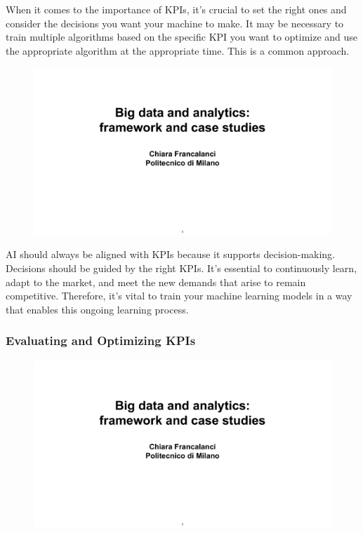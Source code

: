 When it comes to the importance of KPIs, it's crucial to set the right
ones and consider the decisions you want your machine to make. It may be
necessary to train multiple algorithms based on the specific KPI you
want to optimize and use the appropriate algorithm at the appropriate
time. This is a common approach.

\begin{figure}[!h]
  \centering
  \includegraphics[page=21, trim = 0cm 3cm 2.5cm 0.7cm, clip, width=\imagewidth]{images/06 - BIG_DATA.pdf}
\end{figure}

AI should always be aligned with KPIs because it supports
decision-making. Decisions should be guided by the right KPIs. It's
essential to continuously learn, adapt to the market, and meet the new
demands that arise to remain competitive. Therefore, it's vital to train
your machine learning models in a way that enables this ongoing learning
process.

\subsubsection{Evaluating and Optimizing KPIs}

\begin{figure}[!h]
  \centering
  \includegraphics[page=22, trim = 0cm 1.5cm 1.5cm 0.7cm, clip, width=\imagewidth]{images/06 - BIG_DATA.pdf}
\end{figure}

